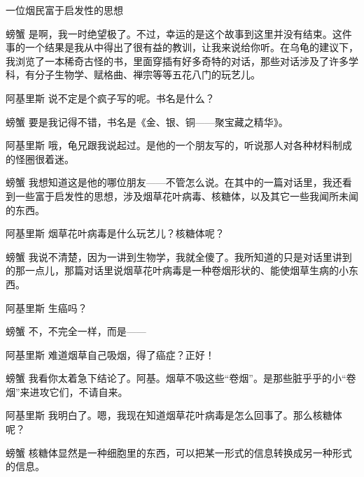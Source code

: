 \begin{dialog}{一位烟民富于启发性的思想}
\begin{dialogue}
\item[螃蟹]是啊，我一时绝望极了。不过，幸运的是这个故事到这里并没有结束。这件事的一个结果是我从中得出了很有益的教训，让我来说给你听。在乌龟的建议下，我浏览了一本稀奇古怪的书，里面穿插有好多奇特的对话，那些对话涉及了许多学科，有分子生物学、赋格曲、禅宗等等五花八门的玩艺儿。

\item[阿基里斯]说不定是个疯子写的呢。书名是什么？

\item[螃蟹]要是我记得不错，书名是《金、银、铜——聚宝藏之精华》。

\item[阿基里斯]哦，龟兄跟我说起过。是他的一个朋友写的，听说那人对各种材料制成的怪圈很着迷。

\item[螃蟹]我想知道这是他的哪位朋友——不管怎么说。在其中的一篇对话里，我还看到一些富于启发性的思想，涉及烟草花叶病毒、核糖体，以及其它一些我闻所未闻的东西。

\item[阿基里斯]烟草花叶病毒是什么玩艺儿？核糖体呢？

\item[螃蟹]我说不清楚，因为一讲到生物学，我就全傻了。我所知道的只是对话里讲到的那一点儿，那篇对话里说烟草花叶病毒是一种卷烟形状的、能使烟草生病的小东西。

\begin{figure}
\end{figure}

\item[阿基里斯]生癌吗？

\item[螃蟹]不，不完全一样，而是——

\item[阿基里斯]难道烟草自己吸烟，得了癌症？正好！

\item[螃蟹]我看你太着急下结论了。阿基。烟草不吸这些“卷烟”。是那些脏乎乎的小“卷烟”来进攻它们，不请自来。

\item[阿基里斯]我明白了。嗯，我现在知道烟草花叶病毒是怎么回事了。那么核糖体呢？

\item[螃蟹]核糖体显然是一种细胞里的东西，可以把某一形式的信息转换成另一种形式的信息。


\end{dialogue}
\end{dialog}
